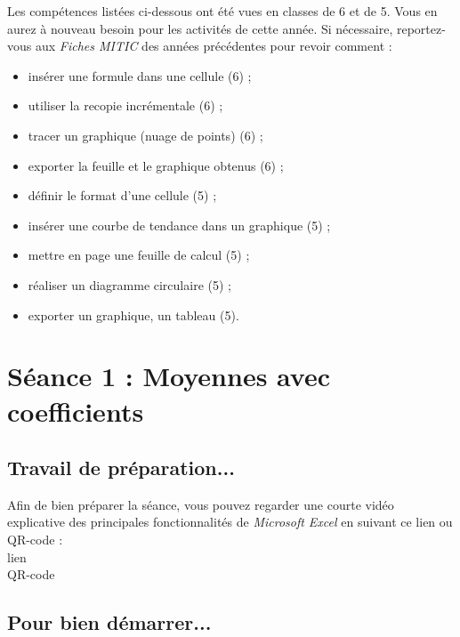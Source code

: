\vspace{12pt}

Les compétences listées ci-dessous ont été vues en classes de 6 et de 5. Vous en aurez à nouveau besoin pour les activités de cette année. Si nécessaire, reportez-vous aux \emph{Fiches MITIC} des années précédentes pour revoir comment :  

\begin{itemize}
\item insérer une formule dans une cellule (6) ;
\item utiliser la recopie incrémentale (6) ;
\item tracer un graphique (nuage de points) (6) ;
\item exporter la feuille et le graphique obtenus (6) ;
\item définir le format d'une cellule (5) ;
\item insérer une courbe de tendance dans un graphique (5) ;
\item mettre en page une feuille de calcul (5) ;
\item réaliser un diagramme circulaire (5) ;
\item exporter un graphique, un tableau (5).
\end{itemize}









%
%
%
%


\section{Séance 1 : Moyennes avec coefficients}\label{ficheTableur4e1}

\subsection{Travail de préparation...}

Afin de bien préparer la séance, vous pouvez regarder une courte vidéo explicative des principales fonctionnalités de \emph{Microsoft Excel} en suivant ce lien ou QR-code :\\

lien\\
QR-code

\subsection{Pour bien démarrer...}

